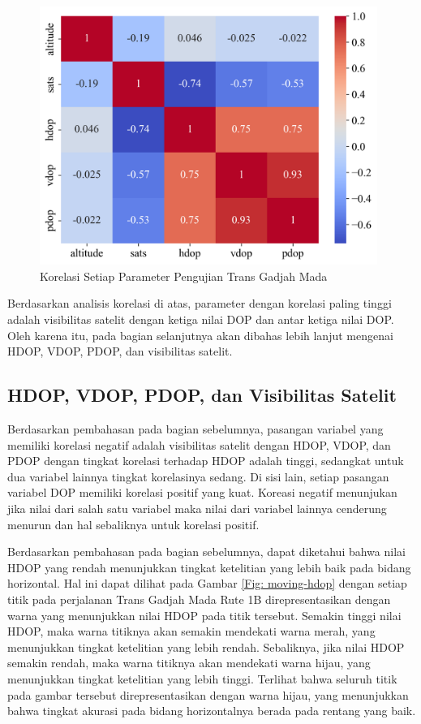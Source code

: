 \begin{figure}[H]
	\centering
	\includegraphics[width=11cm]{contents/chapter-4/pengujian-bergerak/corr.png}
	\caption{Korelasi Setiap Parameter Pengujian Trans Gadjah Mada}
	\label{Fig: moving-corr}
\end{figure}

Berdasarkan analisis korelasi di atas, parameter dengan korelasi paling tinggi adalah visibilitas satelit dengan ketiga nilai DOP dan antar ketiga nilai DOP. Oleh karena itu, pada bagian selanjutnya akan dibahas lebih lanjut mengenai HDOP, VDOP, PDOP, dan visibilitas satelit. 

\subsection{HDOP, VDOP, PDOP, dan Visibilitas Satelit}

Berdasarkan pembahasan pada bagian sebelumnya, pasangan variabel yang memiliki korelasi negatif adalah visibilitas satelit dengan HDOP, VDOP, dan PDOP dengan tingkat korelasi terhadap HDOP adalah tinggi, sedangkat untuk dua variabel lainnya tingkat korelasinya sedang. Di sisi lain, setiap pasangan variabel DOP memiliki korelasi positif yang kuat. Koreasi negatif menunjukan jika nilai dari salah satu variabel maka nilai dari variabel lainnya cenderung menurun dan hal sebaliknya untuk korelasi positif.

Berdasarkan pembahasan pada bagian sebelumnya, dapat diketahui bahwa nilai HDOP yang rendah menunjukkan tingkat ketelitian yang lebih baik pada bidang horizontal. Hal ini dapat dilihat pada Gambar \ref{Fig: moving-hdop} dengan setiap titik pada perjalanan Trans Gadjah Mada Rute 1B direpresentasikan dengan warna yang menunjukkan nilai HDOP pada titik tersebut. Semakin tinggi nilai HDOP, maka warna titiknya akan semakin mendekati warna merah, yang menunjukkan tingkat ketelitian yang lebih rendah. Sebaliknya, jika nilai HDOP semakin rendah, maka warna titiknya akan mendekati warna hijau, yang menunjukkan tingkat ketelitian yang lebih tinggi. Terlihat bahwa seluruh titik pada gambar tersebut direpresentasikan dengan warna hijau, yang menunjukkan bahwa tingkat akurasi pada bidang horizontalnya berada pada rentang yang baik.


